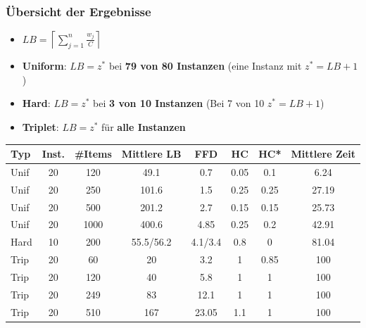 \documentclass{beamer}
\begin{document}
\begin{frame}
\frametitle{Übersicht der Ergebnisse}
\begin{footnotesize}
\begin{itemize}
\item $LB = \left\lceil\sum_{j=1}^{n} \frac{w_j}{C}\right\rceil$
\item \textbf{Uniform}: $LB = z^{*}$ bei \textbf{79 von 80 Instanzen} (eine Instanz mit $z^{*} = LB + 1$)
\item \textbf{Hard}: $LB = z^{*}$ bei \textbf{3 von 10 Instanzen} (Bei 7 von 10 $z^{*} = LB + 1$) 
\item \textbf{Triplet}: $LB = z^{*}$ für \textbf{alle Instanzen} 
\end{itemize}
\end{footnotesize}
\begin{footnotesize}

\begin{table}
\begin{tabular}{l c c c c c c c}
\toprule
\textbf{Typ} & \textbf{Inst.} & \textbf{\#Items} & \textbf{Mittlere LB} & \textbf{FFD} & \textbf{HC} & \textbf{HC*}  & \textbf{Mittlere Zeit}\\
\midrule
Unif  & 20   & 120 & 49.1  & 0.7 & 0.05 & 0.1 & 6.24 \\
Unif  & 20   & 250  & 101.6  & 1.5 & 0.25 & 0.25 & 27.19 \\
Unif  & 20   & 500  & 201.2  & 2.7 & 0.15 & 0.15 &  25.73\\
Unif  & 20   & 1000  & 400.6  & 4.85 & 0.25 & 0.2 & 42.91\\ \midrule
Hard  & 10   & 200  & 55.5/56.2  & 4.1/3.4 & 0.8 & 0 & 81.04 \\\midrule
Trip  & 20   & 60   & 20  & 3.2 & 1 & 0.85 & 100 \\
Trip  & 20   & 120  & 40  & 5.8 & 1 &1& 100 \\
Trip  & 20   & 249  & 83  & 12.1 & 1 &1& 100 \\
Trip  & 20   & 510  & 167  & 23.05 & 1.1 &1& 100 \\

\bottomrule
\end{tabular}
\end{table}
\end{footnotesize}
\end{frame}


\end{document}
